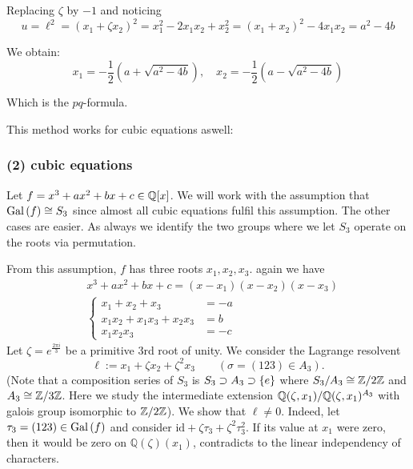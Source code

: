 \documentclass[twoside = false,	%
		headsepline,		%
		parskip = true,
		]{scrbook}						%
\begin{document}
            Replacing $\zeta$ by $-1$ and noticing
            \begin{equation*}
                u = \ell^2 = (x_1 + \zeta x_2)^2 = x_1^2 - 2x_1 x_2 + x_2^2 = (x_1 + x_2)^2 - 4x_1x_2 = a^2 -4b
            \end{equation*}
            
            We obtain:
            \begin{equation*}
                x_1 = -\frac{1}{2}\left(a + \sqrt{a^2 - 4b}\right), \quad x_2 = -\frac{1}{2}\left(a - \sqrt{a^2-4b}\right)
            \end{equation*}
        
            Which is the $pq$-formula.
            
            This method works for cubic equations aswell:
        
        \subsubsection{(2) cubic equations}
            Let $f=x^3+ax^2+bx+c \in\mathbb Q[x]$. We will work with the assumption that $\mathrm{Gal}\left( f\right)\cong S_3$ since almost all cubic equations fulfil this assumption. The other cases are easier. As always we identify the two groups where we let $S_3$ operate on the roots via permutation.
            
            From this assumption, $f$ has three roots $x_1,x_2,x_3$. again we have 
            \begin{align*}
                &x^3+ax^2+bx+c=(x-x_1)(x-x_2)(x-x_3)\\
                &\begin{cases}
                    x_1+x_2+x_3 &=-a\\
                    x_1x_2+x_1x_3+x_2x_3 &=b\\
                    x_1x_2x_3 &=-c
                \end{cases}
            \end{align*}
            Let $\zeta = e^{\frac{2\pi i}3}$ be a primitive 3rd root of unity. We consider the Lagrange resolvent
            $$\ell:=x_1+\zeta x_2+ \zeta^2 x_3 \qquad (\sigma = (123) \in A_3).$$
            (Note that a composition series of $S_3$ is $S_3\supset A_3 \supset \left\{ e\right\}$ where $S_3/A_3 \cong \mathbb Z/2\mathbb Z$ and $A_3\cong \mathbb Z/3\mathbb Z$. Here we study the intermediate extension $\mathbb Q(\zeta,x_1)/\mathbb Q(\zeta,x_1)^{A_3}$ with galois group isomorphic to $\mathbb Z/2\mathbb Z$).
            We show that $\ell\neq 0$. Indeed, let $\tau_3=(123)\in\mathrm{Gal}\left( f\right)$ and consider $\mathrm{id}+\zeta\tau_3+\zeta^2\tau_3^2$. If its value at $x_1$ were zero, then it would be zero on $\mathbb{Q}(\zeta)(x_1)$, contradicts to the linear independency of characters.
            
\end{document}
